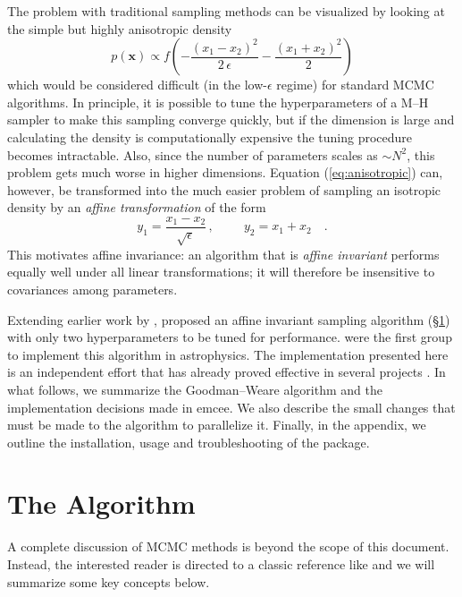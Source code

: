\documentclass[12pt,preprint]{aastex}
\newcommand{\project}[1]{{\sffamily #1}}
\newcommand{\thisplain}{emcee}
\newcommand{\this}{\project{\thisplain}}
\newcommand{\paper}{document}
\newcommand{\Eq}[1]{Equation (\ref{eq:#1})}
\newcommand{\eqlabel}[1]{\label{eq:#1}}
\newcommand{\sect}[1]{\S\ref{sect:#1}}
\newcommand{\sectlabel}[1]{\label{sect:#1}}
\begin{document}
The problem with traditional sampling methods can be visualized by looking
at the simple but highly anisotropic density
\begin{equation}
    \eqlabel{anisotropic}
    p(\mathbf{x}) \propto f \left (-\frac{(x_1-x_2)^2}{2\,\epsilon}
                                        - \frac{(x_1+x_2)^2}{2} \right )
\end{equation}
which would be considered difficult (in the low-$\epsilon$ regime) for
standard MCMC algorithms. In principle, it is possible to tune the
hyperparameters of a M--H sampler to make this sampling converge quickly,
but if the dimension is large and calculating the density
is computationally expensive the tuning procedure becomes intractable.
Also, since the number of parameters scales as $\sim N^2$, this problem gets
much worse in higher dimensions.
\Eq{anisotropic} can, however, be transformed into the much easier problem of
sampling an isotropic density by an \emph{affine transformation} of the form
\begin{equation}
    y_1 = \frac{x_1-x_2}{\sqrt{\epsilon}} \, ,
        \hspace{1cm} y_2 = x_1 + x_2 \quad .
\end{equation}
This motivates affine invariance: an algorithm that is \emph{affine invariant}
performs equally well under all linear transformations; it will therefore be
insensitive to
covariances among parameters.

Extending earlier work by \citet{Christen:2007},
\citet[][hereafter ]{Goodman:2010} proposed an
affine invariant sampling
algorithm (\sect{algo}) with only two hyperparameters to be tuned for
performance. \citet{Hou:2011} were the first group to implement this
algorithm in astrophysics. The implementation presented here is
an independent effort that has already proved effective in several projects
\citep[][Foreman-Mackey \& Widrow\ 2012, in prep.]{Lang:2011,
Bovy:2011, Dorman:2012}.
In what follows, we summarize the Goodman--Weare
algorithm and the implementation
decisions made in \this. We also describe the small changes
that must be made to the algorithm to parallelize it. Finally, in the
appendix, we outline the installation, usage and troubleshooting of
the package.

\section{The Algorithm}\sectlabel{algo}

A complete discussion of MCMC methods is beyond the scope of this \paper.
Instead, the interested reader is directed to a classic reference like
\citet{MacKay:2003} and we will summarize some key concepts below.
\end{document}
